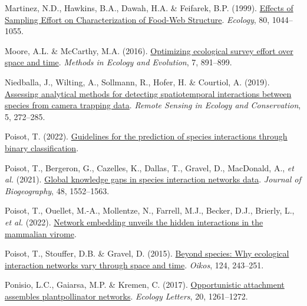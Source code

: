 \documentclass[10pt,oneside]{article}
\newlength{\cslhangindent}
\newenvironment{CSLReferences}[3] %
 {%
  \setlength{\parindent}{0pt}
  \ifodd #1 \everypar{\setlength{\hangindent}{\cslhangindent}}\ignorespaces\fi
  \ifnum #2 > 0
  \setlength{\parskip}{#2\baselineskip}
  \fi
 }%
 {}
\begin{document}
\begin{CSLReferences}{1}{0}
\leavevmode{}%
Martinez, N.D., Hawkins, B.A., Dawah, H.A. \& Feifarek, B.P. (1999).
\href{https://doi.org/10.1890/0012-9658(1999)080\%5B1044:EOSEOC\%5D2.0.CO;2}{Effects
of Sampling Effort on Characterization of Food-Web Structure}.
\emph{Ecology}, 80, 1044--1055.

\leavevmode{}%
Moore, A.L. \& McCarthy, M.A. (2016).
\href{https://doi.org/10.1111/2041-210X.12564}{Optimizing ecological
survey effort over space and time}. \emph{Methods in Ecology and
Evolution}, 7, 891--899.

\leavevmode{}%
Niedballa, J., Wilting, A., Sollmann, R., Hofer, H. \& Courtiol, A.
(2019). \href{https://doi.org/10.1002/rse2.107}{Assessing analytical
methods for detecting spatiotemporal interactions between species from
camera trapping data}. \emph{Remote Sensing in Ecology and
Conservation}, 5, 272--285.

\leavevmode{}%
Poisot, T. (2022).
\href{https://doi.org/10.32942/osf.io/aty7n}{Guidelines for the
prediction of species interactions through binary classification}.

\leavevmode{}%
Poisot, T., Bergeron, G., Cazelles, K., Dallas, T., Gravel, D.,
MacDonald, A., \emph{et al.} (2021).
\href{https://doi.org/10.1111/jbi.14127}{Global knowledge gaps in
species interaction networks data}. \emph{Journal of Biogeography}, 48,
1552--1563.

\leavevmode{}%
Poisot, T., Ouellet, M.-A., Mollentze, N., Farrell, M.J., Becker, D.J.,
Brierly, L., \emph{et al.} (2022).
\href{https://doi.org/10.48550/arXiv.2105.14973}{Network embedding
unveils the hidden interactions in the mammalian virome}.

\leavevmode{}%
Poisot, T., Stouffer, D.B. \& Gravel, D. (2015).
\href{https://doi.org/10.1111/oik.01719}{Beyond species: Why ecological
interaction networks vary through space and time}. \emph{Oikos}, 124,
243--251.

\leavevmode{}%
Ponisio, L.C., Gaiarsa, M.P. \& Kremen, C. (2017).
\href{https://doi.org/10.1111/ele.12821}{Opportunistic attachment
assembles plantpollinator networks}. \emph{Ecology Letters}, 20,
1261--1272.


\end{CSLReferences}
\end{document}
